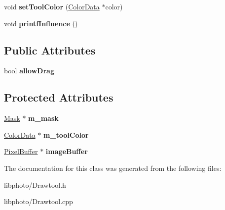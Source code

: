 \begin{DoxyCompactItemize}
\item 
\hypertarget{classDrawTool_a7f7097be5f6beb7b3f6ce437785cac7a}{void {\bfseries set\-Tool\-Color} (\hyperlink{classColorData}{Color\-Data} $\ast$color)}\label{classDrawTool_a7f7097be5f6beb7b3f6ce437785cac7a}

\item 
\hypertarget{classDrawTool_a04f57381cb6c71d90a66e905b46f424c}{void {\bfseries printf\-Influence} ()}\label{classDrawTool_a04f57381cb6c71d90a66e905b46f424c}

\end{DoxyCompactItemize}
\subsection*{Public Attributes}
\begin{DoxyCompactItemize}
\item 
\hypertarget{classDrawTool_a87f991a7c84a4c5ad60ebbfd813a3ab2}{bool {\bfseries allow\-Drag}}\label{classDrawTool_a87f991a7c84a4c5ad60ebbfd813a3ab2}

\end{DoxyCompactItemize}
\subsection*{Protected Attributes}
\begin{DoxyCompactItemize}
\item 
\hypertarget{classDrawTool_a0a3cc5165047f1158bff38750ddf8e85}{\hyperlink{classMask}{Mask} $\ast$ {\bfseries m\-\_\-mask}}\label{classDrawTool_a0a3cc5165047f1158bff38750ddf8e85}

\item 
\hypertarget{classDrawTool_a3bb9153560d2b084c56d5e7d749d49a2}{\hyperlink{classColorData}{Color\-Data} $\ast$ {\bfseries m\-\_\-tool\-Color}}\label{classDrawTool_a3bb9153560d2b084c56d5e7d749d49a2}

\item 
\hypertarget{classDrawTool_a917dfe1261ea0d5c4250f8b83eddb177}{\hyperlink{classPixelBuffer}{Pixel\-Buffer} $\ast$ {\bfseries image\-Buffer}}\label{classDrawTool_a917dfe1261ea0d5c4250f8b83eddb177}

\end{DoxyCompactItemize}


The documentation for this class was generated from the following files\-:\begin{DoxyCompactItemize}
\item 
libphoto/Drawtool.\-h\item 
libphoto/Drawtool.\-cpp\end{DoxyCompactItemize}
